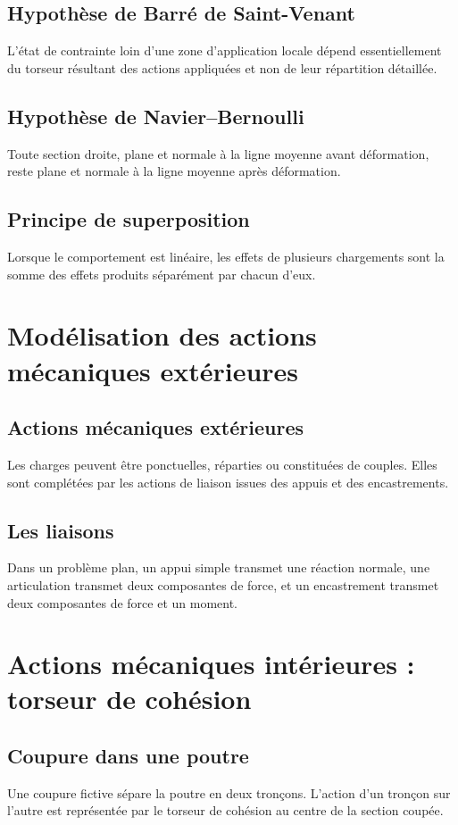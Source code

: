 \subsection{Hypothèse de Barré de Saint-Venant}
L'état de contrainte loin d'une zone d'application locale dépend essentiellement du torseur résultant des actions appliquées et non de leur répartition détaillée.

\subsection{Hypothèse de Navier--Bernoulli}
Toute section droite, plane et normale à la ligne moyenne avant déformation, reste plane et normale à la ligne moyenne après déformation.

\subsection{Principe de superposition}
Lorsque le comportement est linéaire, les effets de plusieurs chargements sont la somme des effets produits séparément par chacun d'eux.

\section{Modélisation des actions mécaniques extérieures}
\subsection{Actions mécaniques extérieures}
Les charges peuvent être ponctuelles, réparties ou constituées de couples. Elles sont complétées par les actions de liaison issues des appuis et des encastrements.

\subsection{Les liaisons}
Dans un problème plan, un appui simple transmet une réaction normale, une articulation transmet deux composantes de force, et un encastrement transmet deux composantes de force et un moment.

\section{Actions mécaniques intérieures : torseur de cohésion}
\subsection{Coupure dans une poutre}
Une coupure fictive sépare la poutre en deux tronçons. L'action d'un tronçon sur l'autre est représentée par le torseur de cohésion au centre de la section coupée.
\TLCoupurePoutre

